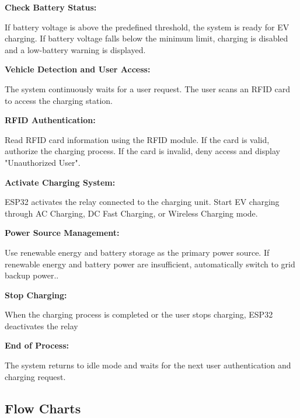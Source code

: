 \documentclass[12pt]{report}
\begin{document}
\begin{Certificatepage}
\begin{center}
\begin{justify}
\textbf{Check Battery Status:}
\par
If battery voltage is above the predefined threshold, the system is ready for EV charging. If battery voltage falls below the minimum limit, charging is disabled and a low-battery warning is displayed.
\vspace{10pt}
\par

\textbf{Vehicle Detection and User Access:}
\par
The system continuously waits for a user request. The user scans an RFID card to access the charging station.
\vspace{10pt}
\par

\textbf{RFID Authentication:}
\par
Read RFID card information using the RFID module. If the card is valid, authorize the charging process. If the card is invalid, deny access and display "Unauthorized User".
\vspace{10pt}
\par

\textbf{Activate Charging System:}
\par
ESP32 activates the relay connected to the charging unit. Start EV charging through AC Charging, DC Fast Charging, or Wireless Charging mode.
\vspace{10pt}
\par

\textbf{Power Source Management:}
\par
Use renewable energy and battery storage as the primary power source. If renewable energy and battery power are insufficient, automatically switch to grid backup power..
\vspace{10pt}
\par

\textbf{Stop Charging:}
\par
When the charging process is completed or the user stops charging, ESP32 deactivates the relay
\vspace{10pt}
\par

\textbf{End of Process:}
\par
The system returns to idle mode and waits for the next user authentication and charging request.
\vspace{10pt}
\par



\newpage
\subsection{Flow Charts}
\label{fc}



\end{justify}
\end{center}
\end{Certificatepage}
\end{document}
